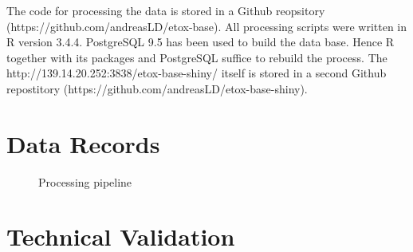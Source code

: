 \documentclass[english]{article}
\newcommand{\app}{http://139.14.20.252:3838/etox-base-shiny/}
\newcommand{\git}{https://github.com/andreasLD/etox-base}
\newcommand{\gitapp}{https://github.com/andreasLD/etox-base-shiny}
\begin{document}
The code for processing the data is stored in a Github reopsitory (\git{}). All processing scripts were written in R version 3.4.4. PostgreSQL 9.5 has been used to build the data base. Hence R together with its packages and PostgreSQL suffice to rebuild the process. The \app{} itself is stored in a second Github repostitory (\gitapp{}).

\section*{Data Records}

\begin{figure}
    
    \caption{Processing pipeline}
    \label{fig:organigram}
\end{figure}



\section*{Technical Validation}
\end{document}

